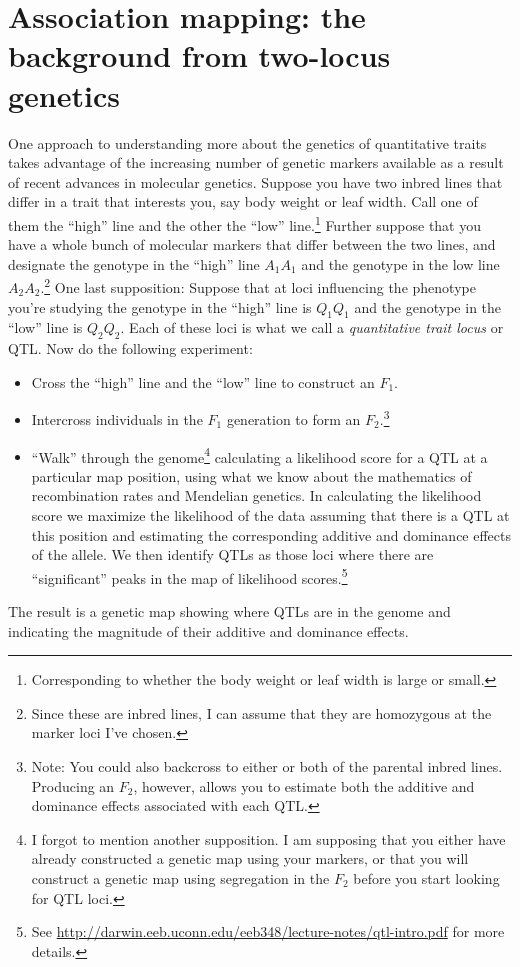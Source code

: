 \chapter{Association mapping: the background from two-locus genetics}

One approach to understanding more about the genetics of quantitative
traits takes advantage of the increasing number of genetic markers
available as a result of recent advances in molecular
genetics. Suppose you have two inbred lines that differ in a trait
that interests you, say body weight or leaf width. Call one of them
the ``high'' line and the other the ``low''
line.\footnote{Corresponding to whether the body weight or leaf width
  is large or small.} Further suppose that you have a whole bunch of
molecular markers that differ between the two lines, and designate the
genotype in the ``high'' line $A_1A_1$ and the genotype in the low
line $A_2A_2$.\footnote{Since these are inbred lines, I can assume
  that they are homozygous at the marker loci I've chosen.} One last
supposition: Suppose that at loci influencing the phenotype you're
studying the genotype in the ``high'' line is $Q_1Q_1$ and the
genotype in the ``low'' line is $Q_2Q_2$. Each of these loci is what
we call a {\it quantitative trait locus\/} or QTL. Now do the following experiment:

\begin{itemize}

\item Cross the ``high'' line and the ``low'' line to construct an
  $F_1$. 

\item Intercross individuals in the $F_1$ generation to form an
  $F_2$.\footnote{Note: You could also backcross to either or both of
    the parental inbred lines. Producing an $F_2$, however, allows you
    to estimate both the additive and dominance effects associated
    with each QTL.}

\item ``Walk'' through the genome\footnote{I forgot to mention another
    supposition. I am supposing that you either have already
    constructed a genetic map using your markers, or that you will
    construct a genetic map using segregation in the $F_2$ before you
    start looking for QTL loci.} calculating a likelihood score for a
  QTL at a particular map position, using what we know about the
  mathematics of recombination rates and Mendelian genetics. In
  calculating the likelihood score we maximize the likelihood of the
  data assuming that there is a QTL at this position and estimating
  the corresponding additive and dominance effects of the allele. We
  then identify QTLs as those loci where there are ``significant''
  peaks in the map of likelihood scores.\footnote{See
    \url{http://darwin.eeb.uconn.edu/eeb348/lecture-notes/qtl-intro.pdf}
    for more details.}

\end{itemize}
The result is a genetic map showing where QTLs are in the genome and
indicating the magnitude of their additive and dominance effects.

